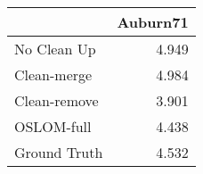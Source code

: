 \begin{tabular}{lr}
\toprule
{} & Auburn71 \\
\midrule
No Clean Up  &    4.949 \\
Clean-merge  &    4.984 \\
Clean-remove &    3.901 \\
OSLOM-full   &    4.438 \\
Ground Truth &    4.532 \\
\bottomrule
\end{tabular}
